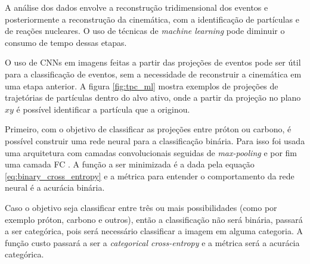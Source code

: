 \documentclass[a4paper,12pt,oneside]{book}
\begin{document}
\begin{appendices}
\par A análise dos dados envolve a reconstrução tridimensional dos eventos e posteriormente a reconstrução da cinemática, com a identificação de partículas e de reações nucleares. O uso de técnicas de \textit{machine learning} pode diminuir o consumo de tempo dessas etapas.

\par O uso de CNNs em imagens feitas a partir das projeções de eventos pode ser útil para a classificação de eventos, sem a necessidade de reconstruir a cinemática em uma etapa anterior. A figura \ref{fig:tpc_ml} mostra exemplos de projeções de trajetórias de partículas dentro do alvo ativo, onde a partir da projeção no plano $xy$ é possível identificar a partícula que a originou.

\par Primeiro, com o objetivo de classificar as projeções entre próton ou carbono, é possível construir uma rede neural para a classificação binária. Para isso foi usada uma arquitetura com camadas convolucionais seguidas de \textit{max-pooling} e por fim uma camada FC \cite{KUCHERAML}. A função a ser minimizada é a dada pela equação \ref{eq:binary_cross_entropy} e a métrica para entender o comportamento da rede neural é a acurácia binária.

\par Caso o objetivo seja classificar entre três ou mais possibilidades (como por exemplo próton, carbono e outros), então a classificação não será binária, passará a ser categórica, pois será necessário classificar a imagem em alguma categoria. A função custo passará a ser a \textit{categorical cross-entropy} e a métrica será a acurácia categórica.


\end{appendices}
\end{document}
